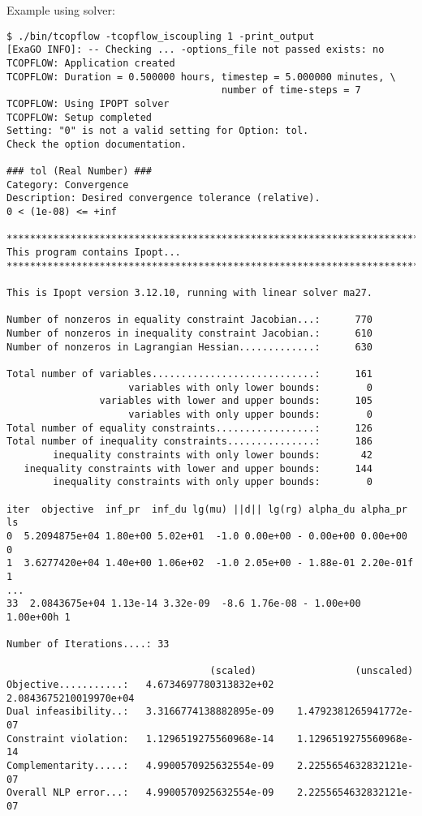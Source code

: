 Example using \ipopt solver:

\begin{lstlisting}
$ ./bin/tcopflow -tcopflow_iscoupling 1 -print_output
[ExaGO INFO]: -- Checking ... -options_file not passed exists: no
TCOPFLOW: Application created
TCOPFLOW: Duration = 0.500000 hours, timestep = 5.000000 minutes, \
                                     number of time-steps = 7
TCOPFLOW: Using IPOPT solver
TCOPFLOW: Setup completed
Setting: "0" is not a valid setting for Option: tol. 
Check the option documentation.

### tol (Real Number) ###
Category: Convergence
Description: Desired convergence tolerance (relative).
0 < (1e-08) <= +inf

*************************************************************************
This program contains Ipopt...
*************************************************************************

This is Ipopt version 3.12.10, running with linear solver ma27.

Number of nonzeros in equality constraint Jacobian...:      770
Number of nonzeros in inequality constraint Jacobian.:      610
Number of nonzeros in Lagrangian Hessian.............:      630

Total number of variables............................:      161
                     variables with only lower bounds:        0
                variables with lower and upper bounds:      105
                     variables with only upper bounds:        0
Total number of equality constraints.................:      126
Total number of inequality constraints...............:      186
        inequality constraints with only lower bounds:       42
   inequality constraints with lower and upper bounds:      144
        inequality constraints with only upper bounds:        0

iter  objective  inf_pr  inf_du lg(mu) ||d|| lg(rg) alpha_du alpha_pr  ls
0  5.2094875e+04 1.80e+00 5.02e+01  -1.0 0.00e+00 - 0.00e+00 0.00e+00   0
1  3.6277420e+04 1.40e+00 1.06e+02  -1.0 2.05e+00 - 1.88e-01 2.20e-01f  1
...
33  2.0843675e+04 1.13e-14 3.32e-09  -8.6 1.76e-08 - 1.00e+00 1.00e+00h 1

Number of Iterations....: 33

                                   (scaled)                 (unscaled)
Objective...........:   4.6734697780313832e+02    2.0843675210019970e+04
Dual infeasibility..:   3.3166774138882895e-09    1.4792381265941772e-07
Constraint violation:   1.1296519275560968e-14    1.1296519275560968e-14
Complementarity.....:   4.9900570925632554e-09    2.2255654632832121e-07
Overall NLP error...:   4.9900570925632554e-09    2.2255654632832121e-07



\end{lstlisting}
